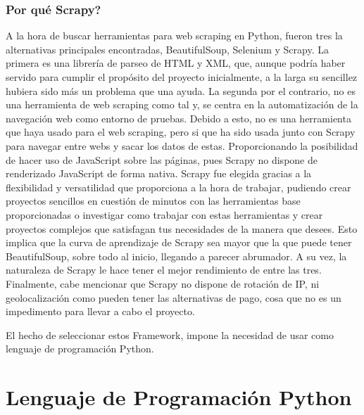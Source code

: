 \subsubsection{Por qué Scrapy?}
A la hora de buscar herramientas para web scraping en Python, fueron tres la alternativas principales encontradas, BeautifulSoup, Selenium y Scrapy.
\newline
\newline
La primera es una librería de parseo de HTML y XML, que, aunque podría haber servido para cumplir el propósito del proyecto inicialmente, a la larga su sencillez hubiera sido más un problema que una ayuda.
\newline
\newline
La segunda por el contrario, no es una herramienta de web scraping como tal y, se centra en la automatización de la navegación web como entorno de pruebas. Debido a esto, no es una herramienta que haya usado para el web scraping, pero si que ha sido usada junto con Scrapy para navegar entre webs y sacar los datos de estas. Proporcionando la posibilidad de hacer uso de JavaScript sobre las páginas, pues Scrapy no dispone de renderizado JavaScript de forma nativa.
\newline
\newline
Scrapy fue elegida gracias a la flexibilidad y versatilidad que proporciona a la hora de trabajar, pudiendo crear proyectos sencillos en cuestión de minutos con las herramientas base proporcionadas o investigar como trabajar con estas herramientas y crear proyectos complejos que satisfagan tus necesidades de la manera que desees. Esto implica que la curva de aprendizaje de Scrapy sea mayor que la que puede tener BeautifulSoup, sobre todo al inicio, llegando a parecer abrumador. A su vez, la naturaleza de Scrapy le hace tener el mejor rendimiento de entre las tres. \cite{glez2014web}
\newline
\newline
Finalmente, cabe mencionar que Scrapy no dispone de rotación de IP, ni geolocalización como pueden tener las alternativas de pago, cosa que no es un impedimento para llevar a cabo el proyecto. 

El hecho de seleccionar estos Framework, impone la necesidad de usar como lenguaje de programación Python.

\section{Lenguaje de Programación Python}


